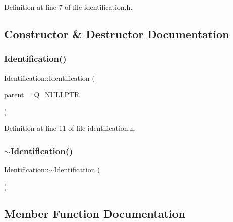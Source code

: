 Definition at line 7 of file identification.\+h.



\subsection{Constructor \& Destructor Documentation}
\mbox{\label{class_identification_a5634a37b031a23098a7cb0c707424bba}} 
\subsubsection{\texorpdfstring{Identification()}{Identification()}}
{\footnotesize\ttfamily Identification\+::\+Identification (\begin{DoxyParamCaption}\item[{Q\+Object $\ast$}]{parent = {\ttfamily Q\+\_\+NULLPTR} }\end{DoxyParamCaption})\hspace{0.3cm}{\ttfamily [inline]}}



Definition at line 11 of file identification.\+h.

\mbox{\label{class_identification_adfc0f9b4ad6867c277a65b6bcba8206e}} 
\subsubsection{\texorpdfstring{$\sim$\+Identification()}{~Identification()}}
{\footnotesize\ttfamily Identification\+::$\sim$\+Identification (\begin{DoxyParamCaption}{ }\end{DoxyParamCaption})\hspace{0.3cm}{\ttfamily [default]}}



\subsection{Member Function Documentation}
\mbox{\label{class_identification_a829ac09ef7f43aafe7abc6f807c6df9f}} 
